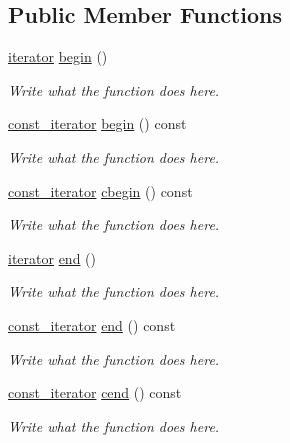 \subsection*{Public Member Functions}
\begin{DoxyCompactItemize}
\item 
\hyperlink{classcircularDeque_1_1iterator}{iterator} \hyperlink{classcircularDeque_a9dc797d3cfe2d6c029155e7859a5f48f}{begin} ()
\begin{DoxyCompactList}\small\item\em Write what the function does here. \end{DoxyCompactList}\item 
\hyperlink{classcircularDeque_1_1const__iterator}{const\+\_\+iterator} \hyperlink{classcircularDeque_a3ae2a586b0eb77f6aff1e5173a4ee10b}{begin} () const 
\begin{DoxyCompactList}\small\item\em Write what the function does here. \end{DoxyCompactList}\item 
\hyperlink{classcircularDeque_1_1const__iterator}{const\+\_\+iterator} \hyperlink{classcircularDeque_a3f824eb07d79d73f6a9cbda89b642282}{cbegin} () const 
\begin{DoxyCompactList}\small\item\em Write what the function does here. \end{DoxyCompactList}\item 
\hyperlink{classcircularDeque_1_1iterator}{iterator} \hyperlink{classcircularDeque_a8c37bcb20930c20159d8b147e8aa5b09}{end} ()
\begin{DoxyCompactList}\small\item\em Write what the function does here. \end{DoxyCompactList}\item 
\hyperlink{classcircularDeque_1_1const__iterator}{const\+\_\+iterator} \hyperlink{classcircularDeque_a0c6429b40e230385343c6266137a3df3}{end} () const 
\begin{DoxyCompactList}\small\item\em Write what the function does here. \end{DoxyCompactList}\item 
\hyperlink{classcircularDeque_1_1const__iterator}{const\+\_\+iterator} \hyperlink{classcircularDeque_abf11c31d601e9b5d215ec7786b19ab38}{cend} () const 
\begin{DoxyCompactList}\small\item\em Write what the function does here. \end{DoxyCompactList}\item 

\end{DoxyCompactItemize}
